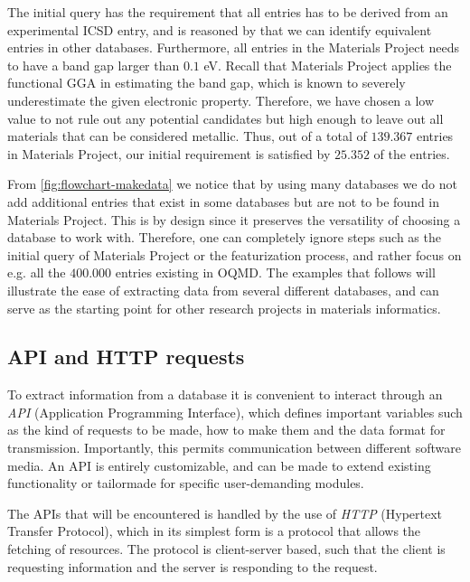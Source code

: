 

\noindent The initial query has the requirement that all entries has to be derived from an experimental ICSD entry, and is reasoned by that we can identify equivalent entries in other databases. Furthermore, all entries in the Materials Project needs to have a band gap larger than $0.1$ eV. Recall that Materials Project applies the functional GGA in estimating the band gap, which is known to severely underestimate the given electronic property. Therefore, we have chosen a low value to not rule out any potential candidates but high enough to leave out all materials that can be considered metallic. Thus, out of a total of $139.367$ entries in Materials Project, our initial requirement is satisfied by $25.352$ of the entries.

From \autoref{fig:flowchart-makedata} we notice that by using many databases we do not add additional entries that exist in some databases but are not to be found in Materials Project. This is by design since it preserves the versatility of choosing a database to work with. Therefore, one can completely ignore steps such as the initial query of Materials Project or the featurization process, and rather focus on e.g. all the $400.000$ entries existing in OQMD. The examples that follows will illustrate the ease of extracting data from several different databases, and can serve as the starting point for other research projects in materials informatics.

\subsection{API and HTTP requests}

To extract information from a database it is convenient to interact through an \textit{API} (Application Programming Interface), which defines important variables such as the kind of requests to be made, how to make them and the data format for transmission. Importantly, this permits communication between different software media. An API is entirely customizable, and can be made to extend existing functionality or tailormade for specific user-demanding modules.

The APIs that will be encountered is handled by the use of \textit{HTTP} (Hypertext Transfer Protocol), which in its simplest form is a protocol that allows the fetching of resources. The protocol is client-server based, such that the client is requesting information and the server is responding to the request.

